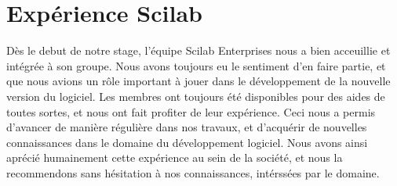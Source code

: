 \section*{Exp\'erience Scilab}

D\`es le debut de notre stage, l'équipe {\sc Scilab Enterprises} nous a
bien acceuillie et intégrée à son groupe.
Nous avons toujours eu le sentiment d'en faire partie,
et que nous avions un r\^ole important \`a jouer dans le
d\'eveloppement de la nouvelle version du logiciel.
Les membres ont toujours \'et\'e disponibles pour des aides
de toutes sortes, et nous ont fait profiter de leur exp\'erience.
Ceci nous a permis d'avancer de mani\`ere réguli\`ere dans nos travaux,
et d'acquérir de nouvelles connaissances dans le domaine du
d\'eveloppement logiciel.
Nous avons ainsi aprécié humainement cette exp\'erience au sein de la société,
et nous la recommendons sans hésitation à nos connaissances,
int\'erss\'ees par le domaine.

